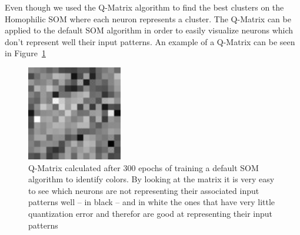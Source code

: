 Even though we used the Q-Matrix algorithm to find the best clusters on the Homophilic SOM where each neuron represents a cluster. The Q-Matrix can be applied to the default \ac{SOM} algorithm in order to easily visualize neurons which don't represent well their input patterns. An example of a Q-Matrix can be seen in Figure~\ref{fig:som_trqmatrix}
\begin{figure}[htpb]
  \centering
  \includegraphics[scale=2]{./images/som_training/2_quantmatrix.pdf}
  \caption{Q-Matrix calculated after 300 epochs of training a default SOM algorithm to identify colors. By looking at the matrix it is very easy to see which neurons are not representing their associated input patterns well -- in black -- and in white the ones that have very little quantization error and therefor are good at representing their input patterns}
  \label{fig:som_trqmatrix}
\end{figure}

